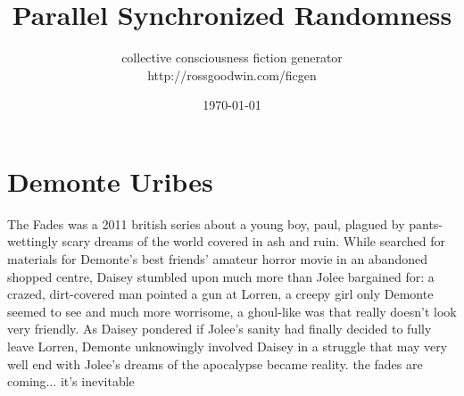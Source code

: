 \documentclass[12pt]{book}
\title{Parallel Synchronized Randomness}
\author{collective consciousness fiction generator\\http://rossgoodwin.com/ficgen}
\date{\today}
\begin{document}
\maketitle



\chapter{Demonte Uribes}

The Fades was a 2011 british series about a young boy, paul, plagued by pants-wettingly scary dreams of the world covered in ash and ruin. While searched for materials for Demonte's best friends' amateur horror movie in an abandoned shopped centre, Daisey stumbled upon much more than Jolee bargained for: a crazed, dirt-covered man pointed a gun at Lorren, a creepy girl only Demonte seemed to see and much more worrisome, a ghoul-like was that really doesn't look very friendly. As Daisey pondered if Jolee's sanity had finally decided to fully leave Lorren, Demonte unknowingly involved Daisey in a struggle that may very well end with Jolee's dreams of the apocalypse became reality. the fades are coming... it's inevitable
\end{document}
